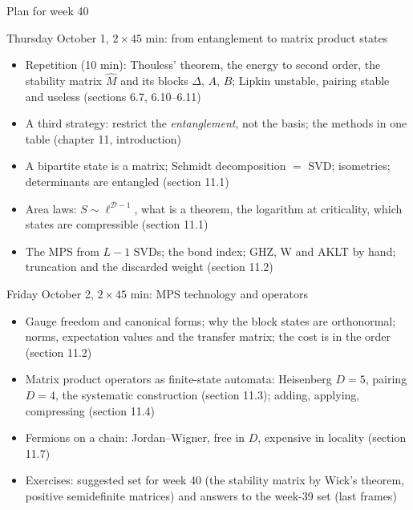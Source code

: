 \documentclass[aspectratio=169,10pt]{beamer}
\begin{document}
\begin{frame}[shrink=5]{Plan for week 40}
  \scriptsize
  \begin{block}{Thursday October 1, $2\times45$ min: from entanglement to matrix product states}
    \begin{itemize}
      \item Repetition (10 min): Thouless' theorem, the energy to second order, the stability matrix $\hat M$ and its blocks $\Delta$, $A$, $B$; Lipkin unstable, pairing stable and useless (sections 6.7, 6.10--6.11)
      \item A third strategy: restrict the \emph{entanglement}, not the basis; the methods in one table (chapter 11, introduction)
      \item A bipartite state is a matrix; Schmidt decomposition $=$ SVD; isometries; determinants are entangled (section 11.1)
      \item Area laws: $S\sim\ell^{\mathcal D-1}$, what is a theorem, the logarithm at criticality, which states are compressible (section 11.1)
      \item The MPS from $L-1$ SVDs; the bond index; GHZ, W and AKLT by hand; truncation and the discarded weight (section 11.2)
    \end{itemize}
  \end{block}
  \begin{block}{Friday October 2, $2\times45$ min: MPS technology and operators}
    \begin{itemize}
      \item Gauge freedom and canonical forms; why the block states are orthonormal; norms, expectation values and the transfer matrix; the cost is in the order (section 11.2)
      \item Matrix product operators as finite-state automata: Heisenberg $D=5$, pairing $D=4$, the systematic construction (section 11.3); adding, applying, compressing (section 11.4)
      \item Fermions on a chain: Jordan--Wigner, free in $D$, expensive in locality (section 11.7)
      \item Exercises: suggested set for week 40 (the stability matrix by Wick's theorem, positive semidefinite matrices) and answers to the week-39 set (last frames)
    \end{itemize}
  \end{block}
\end{frame}

\end{document}
